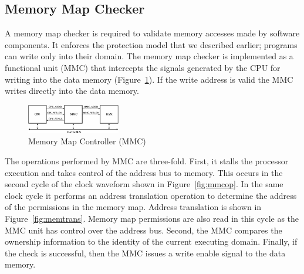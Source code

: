 \subsection{Memory Map Checker}
%
A memory map checker is required to validate memory accesses made by software components.
%
It enforces the protection model that we described earlier; programs can write only into their domain.
%
The memory map checker is implemented as a functional unit (MMC) that intercepts the signals generated by the CPU for writing into the data memory (Figure~\ref{fig:mmcramcpu}).
%
If the write address is valid the MMC writes directly into the data memory.
%
\begin{figure}[htbp]
   \centering
   \includegraphics[height=0.5in, keepaspectratio=true]{figures/mmcramcpu.pdf} 
   \caption{Memory Map Controller (MMC)}
   \label{fig:mmcramcpu}
\end{figure}
%

The operations performed by MMC are three-fold.
%
First, it stalls the processor execution and takes control of the address bus to memory.
%
This occurs in the second cycle of the clock waveform shown in Figure~\ref{fig:mmcop}.
%
In the same clock cycle it performs an address translation operation to determine the address of the permissions in the memory map.
%
Address translation is shown in Figure~\ref{fig:memtrans}.
%
Memory map permissions are also read in this cycle as the MMC unit has control over the address bus.
%
Second, the MMC compares the ownership information to the identity of the current executing domain.
%
Finally, if the check is successful, then the MMC issues a write enable signal to the data memory.


